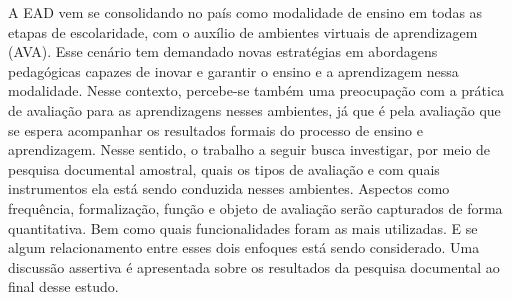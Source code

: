 

A \acrfull{EAD} vem se consolidando no país como modalidade de ensino em todas as etapas de escolaridade, com o auxílio de ambientes virtuais de aprendizagem (AVA). Esse cenário tem demandado novas estratégias em abordagens pedagógicas capazes de inovar e garantir o ensino e a aprendizagem nessa modalidade. Nesse contexto, percebe-se também uma preocupação com a prática de avaliação para as aprendizagens nesses ambientes, já que é pela avaliação que se espera acompanhar os resultados formais do processo de ensino e aprendizagem. Nesse sentido, o trabalho a seguir busca investigar, por meio de pesquisa documental amostral, quais os tipos de avaliação e com quais instrumentos ela está sendo conduzida nesses ambientes. Aspectos como frequência, formalização, função e objeto de avaliação serão capturados de forma quantitativa. Bem como quais funcionalidades foram as mais utilizadas. E se algum relacionamento entre esses dois enfoques está sendo considerado. Uma discussão assertiva é apresentada sobre os resultados da pesquisa documental ao final desse estudo.


